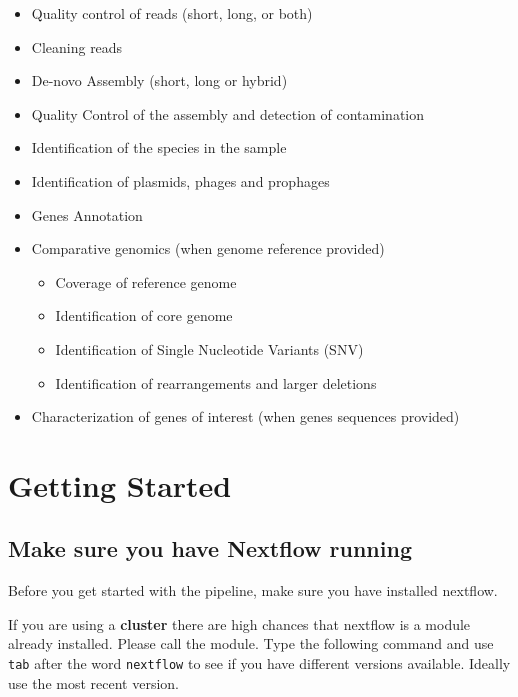 \documentclass[
]{book}
\providecommand{\tightlist}{%
  \setlength{\itemsep}{0pt}\setlength{\parskip}{0pt}}
\begin{document}
\begin{itemize}
\tightlist
\item
  Quality control of reads (short, long, or both)
\item
  Cleaning reads
\item
  De-novo Assembly (short, long or hybrid)
\item
  Quality Control of the assembly and detection of contamination
\item
  Identification of the species in the sample
\item
  Identification of plasmids, phages and prophages
\item
  Genes Annotation
\item
  Comparative genomics (when genome reference provided)

  \begin{itemize}
  \tightlist
  \item
    Coverage of reference genome
  \item
    Identification of core genome
  \item
    Identification of Single Nucleotide Variants (SNV)
  \item
    Identification of rearrangements and larger deletions
  \end{itemize}
\item
  Characterization of genes of interest (when genes sequences provided)
\end{itemize}

\hypertarget{getting-started}{%
\chapter{Getting Started}\label{getting-started}}

\hypertarget{make-sure-you-have-nextflow-running}{%
\section{Make sure you have Nextflow running}\label{make-sure-you-have-nextflow-running}}

Before you get started with the pipeline, make sure you have installed nextflow.

If you are using a \textbf{cluster} there are high chances that nextflow is a module already installed. Please call the module. Type the following command and use \texttt{tab} after the word \texttt{nextflow} to see if you have different versions available. Ideally use the most recent version.
\end{document}
